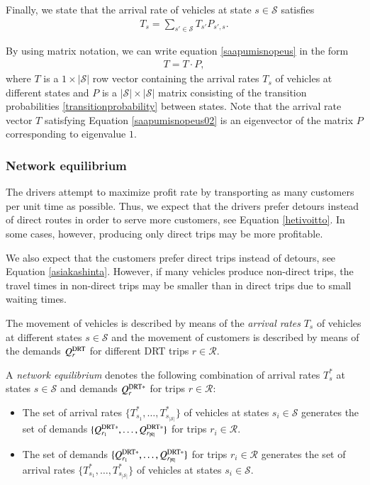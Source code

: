 \documentclass[dissertation,draft*]{aaltoseries}
\begin{document}
Finally, we state that the arrival rate of vehicles 
at state $s \in \mathcal{S}$ satisfies
\begin{align}
\label{saapumisnopeus}
T_s = \sum_{s' \in \mathcal{S}} T_{s'} P_{s',s}.
\end{align}

By using matrix notation, we can write equation \eqref{saapumisnopeus}
in the form
\begin{align}
\label{saapumisnopeus02}
T = T \cdot P, 
\end{align}
where $T$ is a $1 \times |\mathcal{S}|$ row vector containing the arrival rates $T_s$ 
of vehicles at different states and $P$ is a $|\mathcal{S}|\times |\mathcal{S}|$ matrix
consisting of the transition probabilities \eqref{transitionprobability} between states.
Note that the arrival rate vector $T$ satisfying Equation \eqref{saapumisnopeus02} 
is an eigenvector of the matrix $P$ corresponding to eigenvalue $1$.


\subsubsection{Network equilibrium}
\label{networkequilibrium}
The drivers attempt to maximize profit rate by 
transporting as many customers per unit time as possible. Thus, we expect that the
drivers prefer detours instead of direct routes in order to serve more 
customers, see Equation \eqref{hetivoitto}.
In some cases, however, producing only direct trips may be more profitable. 

We also expect that the customers prefer direct trips instead of detours, see Equation \eqref{asiakashinta}.
However, if many vehicles produce non-direct trips, 
the travel times in non-direct trips may be smaller than in direct trips due 
to small waiting times.

The movement of vehicles is described by means of the \emph{arrival rates} $T_s$ 
of vehicles at different states $s \in \mathcal{S}$ and
the movement of customers is described by means of the demands $Q^{\rm DRT}_r$ 
for different DRT trips $r \in \mathcal{R}$. 

A \emph{network equilibrium} denotes the following combination of
arrival rates $T_s^*$ at states $s \in \mathcal{S}$ and demands $Q_r^{{\rm DRT}*}$ for trips $r \in \mathcal{R}$: 
\begin{itemize}
\item
The set of arrival rates $\{T_{s_1}^*,\ldots,T_{s_{|\mathcal{S}|}}^*\}$ of vehicles at states $s_i \in \mathcal{S}$ 
generates the set of demands $\{Q_{r_1}^{{\rm DRT}*},\ldots,Q_{r_{|\mathcal{R}|}}^{{\rm DRT}*}\}$ for trips $r_i \in \mathcal{R}$.
\item
The set of demands $\{Q_{r_1}^{{\rm DRT}*},\ldots,Q_{r_{|\mathcal{R}|}}^{{\rm DRT}*}\}$ for trips $r_i \in \mathcal{R}$
generates the set of arrival rates $\{T_{s_1}^*,\ldots,T_{s_{|\mathcal{S}|}}^*\}$ of vehicles at states $s_i \in \mathcal{S}$. 
\end{itemize}
\end{document}
